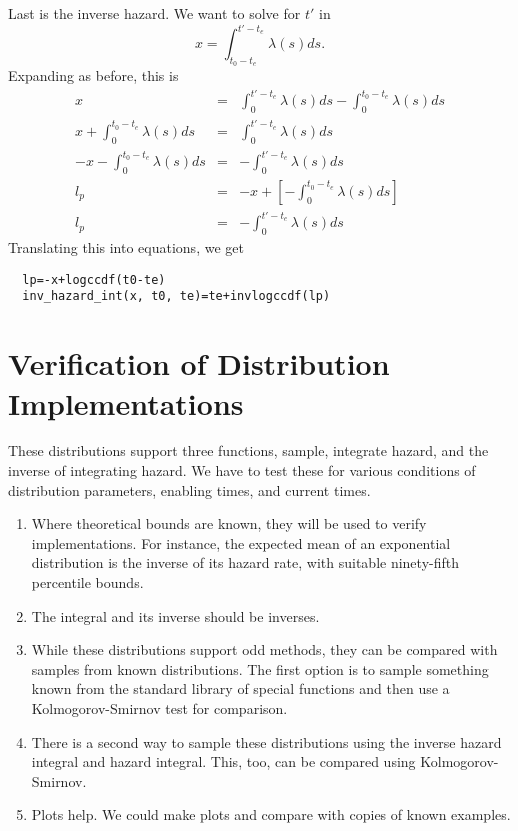 \documentclass{article}
\begin{document}
Last is the inverse hazard. We want to solve for $t'$ in
\begin{equation}
  x=\int_{t_0-t_e}^{t'-t_e}\lambda(s)ds.
\end{equation}
Expanding as before, this is
\begin{eqnarray}
  x&=&\int_{0}^{t'-t_e}\lambda(s)ds-\int_{0}^{t_0-t_e}\lambda(s)ds \\
  x+\int_{0}^{t_0-t_e}\lambda(s)ds&=&\int_{0}^{t'-t_e}\lambda(s)ds \\
  -x-\int_{0}^{t_0-t_e}\lambda(s)ds&=& -\int_{0}^{t'-t_e}\lambda(s)ds \\
  l_p&=&-x+\left[-\int_{0}^{t_0-t_e}\lambda(s)ds\right] \\
  l_p&=&-\int_{0}^{t'-t_e}\lambda(s)ds
\end{eqnarray}
Translating this into equations, we get
\begin{lstlisting}
  lp=-x+logccdf(t0-te)
  inv_hazard_int(x, t0, te)=te+invlogccdf(lp)
\end{lstlisting}


\section{Verification of Distribution Implementations}

These distributions support three functions, sample, integrate
hazard, and the inverse of integrating hazard. We have to test
these for various conditions of distribution parameters,
enabling times, and current times.

\begin{enumerate}

\item Where theoretical bounds are known, they will be used to verify
implementations. For instance, the expected mean of an 
exponential distribution is the inverse of its hazard rate,
with suitable ninety-fifth percentile bounds.

\item The integral and its inverse should be inverses.

\item While these distributions support odd methods, they
can be compared with samples from known distributions.
The first option is to sample something known from the standard
library of special functions and then use a Kolmogorov-Smirnov
test for comparison.

\item There is a second way to sample these distributions using
the inverse hazard integral and hazard integral. This, too,
can be compared using Kolmogorov-Smirnov.

\item Plots help. We could make plots and compare with copies
of known examples.

\end{enumerate}
\end{document}
